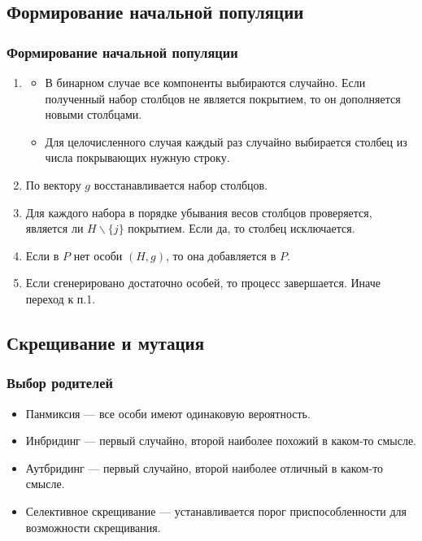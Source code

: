 \documentclass[
	11pt,
]{beamer}
\begin{document}
\subsection{Формирование начальной популяции}

\begin{frame}
	\frametitle{Формирование начальной популяции}

	\begin{enumerate}
			\item
				\begin{itemize}
					\item В бинарном случае все компоненты выбираются случайно. Если полученный набор столбцов не является покрытием, то он дополняется новыми столбцами.
					\item Для целочисленного случая каждый раз случайно выбирается столбец из числа покрывающих нужную строку.
				\end{itemize}
			\item По вектору $g$ восстанавливается набор столбцов.
			\item Для каждого набора в порядке убывания весов столбцов проверяется, является ли $H \backslash \{j\}$ покрытием. Если да, то столбец исключается.
			\item Если в $P$ нет особи $(H, g)$, то она добавляется в $P$.
			\item Если сгенерировано достаточно особей, то процесс завершается. Иначе переход к п.1.
	\end{enumerate}
\end{frame}

\subsection{Скрещивание и мутация}

\begin{frame}
	\frametitle{Выбор родителей}

	\begin{itemize}
			\item Панмиксия — все особи имеют одинаковую вероятность.
			\item Инбридинг — первый случайно, второй наиболее похожий в каком-то смысле.
			\item Аутбридинг — первый случайно, второй наиболее отличный в каком-то смысле.
			\item Селективное скрещивание — устанавливается порог приспособленности для возможности скрещивания.
	\end{itemize}
\end{frame}
\end{document}
